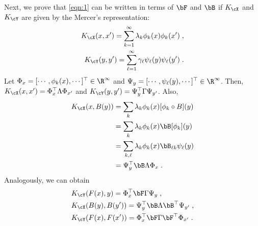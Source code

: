 \documentclass[11pt]{article}
\begin{document}
Next, we prove that \eqref{eqn:1} can be written in terms of $\bF$ and $\bB$ if $K_{\cX}$ and $K_{\cY}$ are given by the Mercer's representation:
\begin{align}
	\label{eqn:k_x}
	K_{\cX}(x, x') = \sum_{k = 1}^{\infty} \lambda_k \phi_k(x) \phi_k(x')\;, \\
	\label{eqn:k_y}
	K_{\cY}(y, y') = \sum_{\ell = 1}^{\infty} \gamma_\ell \psi_\ell(y) \psi_\ell(y')\;.
\end{align}
Let $\Phi_x = [\cdots, \phi_k(x), \cdots ]^\top \in \R^\infty$ and $\Psi_y = [\cdots, \psi_\ell(y), \cdots]^\top \in \R^\infty$. Then, $K_{\cX}(x, x') = \Phi_{x}^\top \Lambda \Phi_{x'}$ and $K_{\cY}(y, y') = \Psi_{y}^\top \Gamma \Psi_{y'}$. Also, 
\begin{align*}
	K_{\cX}(x, B(y)) &= \sum_{k} \lambda_k \phi_k(x) [\phi_k \circ B] (y) \\
	& =\sum_{k} \lambda_k \phi_k(x) \bB[\phi_k] (y) \\
	& = \sum_{k, \ell} \lambda_k \phi_k(x) \bB_{\ell k} \psi_\ell(y) \\
	& = \Psi_{y}^\top \bB \Lambda \Phi_{x} \;.
\end{align*}
Analogously, we can obtain 
\begin{align*}
	& K_{\cY}(F(x), y) = \Phi_{x}^\top \bF \Gamma \Psi_{y} \;, \\
	& K_{\cX}(B(y), B(y')) = \Psi_{y}^\top \bB \Lambda \bB^\top \Psi_{y'} \;, \\
	& K_{\cY}(F(x), F(x')) = \Phi_{x}^\top \bF \Gamma \bF^\top \Phi_{x'} \;. \\
\end{align*}
\end{document}
